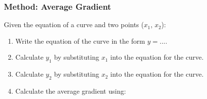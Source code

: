             \subsubsection{ Method: Average Gradient}
            \nopagebreak
        \label{m39223*id190691}Given the equation of a curve and two points (${x}_{1}$, ${x}_{2}$):\par 
        \label{m39223*id190722}\begin{enumerate}[noitemsep, label=\textbf{\arabic*}. ] 
            \label{m39223*uid5}\item Write the equation of the curve in the form $y=...$.
\label{m39223*uid6}\item Calculate ${y}_{1}$ by substituting ${x}_{1}$ into the equation for the curve.
\label{m39223*uid7}\item Calculate ${y}_{2}$ by substituting ${x}_{2}$ into the equation for the curve.
\label{m39223*uid8}\item Calculate the average gradient using:
\label{m39223*id189188}\nopagebreak\noindent{}
    \end{enumerate}
\par
            \label{m39223*secfhsst!!!underscore!!!id408}\vspace{.5cm} 
      \noindent
